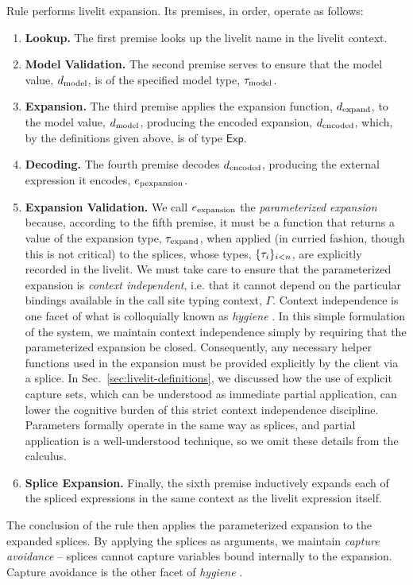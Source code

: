 Rule  performs livelit expansion. Its premises, in order, operate as follows:
\begin{enumerate}
    \item \textbf{Lookup.} The first premise looks up the livelit name in the livelit context.
    \item \textbf{Model Validation.} The second premise serves to ensure that the model value, $d_\text{model}$, is of the
    specified model type, $\tau_\text{model}$.
    \item \textbf{Expansion.} The third premise applies the expansion function, $d_\text{expand}$, to the model value, $d_\text{model}$,
    producing the encoded expansion, $d_\text{encoded}$, which, by the definitions given above, is of type $\mathsf{Exp}$.
    \item \textbf{Decoding.} The fourth premise decodes $d_\text{encoded}$, producing the external expression it encodes, $e_\text{pexpansion}$.
    \item \textbf{Expansion Validation.} We call $e_\text{expansion}$ the \emph{parameterized expansion} because, according to the fifth premise,
    it must be a function that returns a value of the expansion type, $\tau_\text{expand}$, when applied (in curried fashion, though this is not critical)
    to the splices, whose types, $\{\tau_i\}_{i < n}$, are explicitly recorded in the livelit.
    We must take care to ensure that the parameterized expansion is \emph{context independent},
    i.e. that it cannot depend on the particular bindings available in the call site typing context, $\Gamma$.
    Context independence is one facet of what is colloquially known as \emph{hygiene} \cite{TLMs}.
    In this simple formulation of the system, we maintain context independence simply by
    requiring that the parameterized expansion be
    closed. Consequently, any necessary helper functions used in the expansion must be provided explicitly by the client
    via a splice. In Sec.~\ref{sec:livelit-definitions}, we discussed how the use of explicit capture sets, which can be understood as 
    immediate partial application, can lower the cognitive burden of this strict context independence discipline.
    Parameters formally operate in the same way as splices, and partial application is a well-understood technique, so we omit these details from the calculus.
    \item \textbf{Splice Expansion.} Finally, the sixth premise inductively expands each of the spliced expressions in the same context as the livelit
    expression itself.
\end{enumerate}
The conclusion of the rule then applies the parameterized expansion to the expanded splices.
By applying the splices as arguments, we maintain \emph{capture avoidance} -- splices cannot capture variables
bound internally to the expansion. Capture avoidance is the other facet of \emph{hygiene} \cite{TLMs}.

